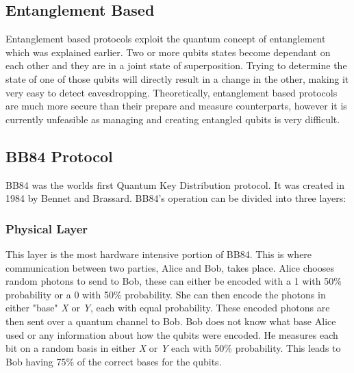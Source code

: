 \documentclass[journal]{IEEEtran}
\begin{document}
\subsection{Entanglement Based}
Entanglement based protocols exploit the quantum concept of entanglement which was explained earlier. Two or more qubits states become dependant on each other and they are in a joint state of superposition. Trying to determine the state of one of those qubits will directly result in a change in the other, making it very easy to
detect eavesdropping. Theoretically, entanglement based protocols are  much more secure than their prepare and measure counterparts, however it is currently unfeasible as managing and creating entangled qubits is very difficult.
\subsection{BB84 Protocol}
BB84 was the worlds first Quantum Key Distribution protocol. It was created in 1984 by Bennet and Brassard. BB84's operation can be divided into three layers:
\subsubsection{Physical Layer}
This layer is the most hardware intensive portion of BB84. This is where communication between two parties, Alice and Bob, takes place. Alice chooses random photons to send to Bob, these can either be encoded with a 1 with 50\% probability or a 0 with 50\% probability.
She can then encode the photons in either "base" \emph{X} or \emph{Y}, each with equal probability. These encoded photons are then sent over a quantum channel to Bob. Bob does not know what base Alice used or any information about how the qubits were encoded. He measures each bit on a random basis in either \emph{X} or \emph{Y} each with 50\% probability.
This leads to Bob having 75\% of the correct bases for the qubits.
\end{document}

